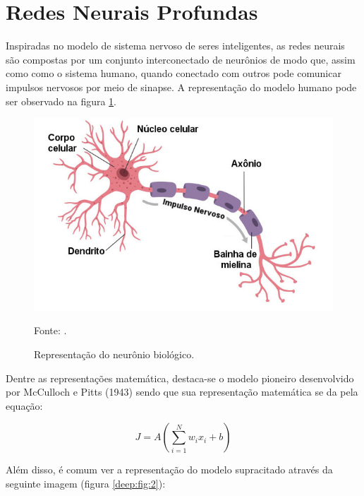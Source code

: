 \newpage
\clearpage
\section{Redes Neurais Profundas}
\label{deep:deep}

Inspiradas no modelo de sistema nervoso de seres inteligentes, as redes neurais são compostas por um conjunto interconectado de neurônios de modo que, assim como como o sistema humano, quando conectado com outros pode comunicar impulsos nervosos por meio de sinapse. A representação do modelo humano pode ser observado na figura \ref{deep:fig:1}.

\begin{figure}[H]
    \centering
    \caption{Representação do neurônio biológico.}
    \includegraphics[width=1\linewidth]{recursos/imagens/deep/neuronio.jpg}
    \label{deep:fig:1}

    \vspace*{1 cm}
    Fonte: \cite{Neuronio:Educacao}.
\end{figure}

Dentre as representações matemática, destaca-se o modelo pioneiro desenvolvido por McCulloch e Pitts (1943) \cite{mcculloch1943logical} sendo que sua representação matemática se da pela equação:

\begin{equation}
    \label{deep:eq:1}
    J = A(\sum_{i = 1}^{N} w_i x_i +b)
\end{equation}

Além disso, é comum ver a representação do modelo supracitado através da seguinte imagem (figura \ref{deep:fig:2}):

